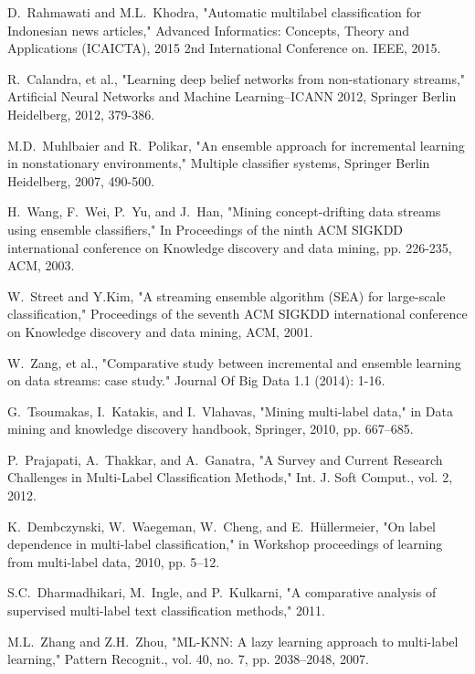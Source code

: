\documentclass[conference]{IEEEtran}
\begin{document}
\begin{thebibliography}{1}
D.~Rahmawati and M.L.~Khodra,
    "Automatic multilabel classification for Indonesian news articles,"
    Advanced Informatics: Concepts, Theory and Applications (ICAICTA),
    2015 2nd International Conference on. IEEE, 2015.

R.~Calandra, et al.,
    "Learning deep belief networks from non-stationary streams,"
    Artificial Neural Networks and Machine Learning–ICANN 2012,
    Springer Berlin Heidelberg, 2012, 379-386.

M.D.~Muhlbaier and R.~Polikar,
    "An ensemble approach for incremental learning in nonstationary environments,"
    Multiple classifier systems, Springer Berlin Heidelberg, 2007, 490-500.

H.~Wang, F.~Wei, P.~Yu, and J.~Han,
    "Mining concept-drifting data streams using ensemble classifiers,"
    In Proceedings of the ninth ACM SIGKDD international conference on Knowledge discovery and data mining,
    pp. 226-235, ACM, 2003.

W.~Street and Y.Kim,
    "A streaming ensemble algorithm (SEA) for large-scale classification,"
    Proceedings of the seventh ACM SIGKDD international conference on Knowledge discovery and data mining,
    ACM, 2001.

W.~Zang, et al.,
    "Comparative study between incremental and ensemble learning on data streams: case study."
    Journal Of Big Data 1.1 (2014): 1-16.

G.~Tsoumakas, I.~Katakis, and I.~Vlahavas,
    "Mining multi-label data,"
    in Data mining and knowledge discovery handbook,
    Springer, 2010, pp. 667–685.

P.~Prajapati, A.~Thakkar, and A.~Ganatra,
    "A Survey and Current Research Challenges in Multi-Label Classification Methods,"
    Int. J. Soft Comput., vol. 2, 2012.

K.~Dembczynski, W.~Waegeman, W.~Cheng, and E.~Hüllermeier,
    "On label dependence in multi-label classification,"
    in Workshop proceedings of learning from multi-label data,
    2010, pp. 5–12.

S.C.~Dharmadhikari, M.~Ingle, and P.~Kulkarni,
    "A comparative analysis of supervised multi-label text classification methods,"
    2011.

M.L.~Zhang and Z.H.~Zhou,
    "ML-KNN: A lazy learning approach to multi-label learning,"
    Pattern Recognit., vol. 40, no. 7, pp. 2038–2048, 2007.


\end{thebibliography}
\end{document}
